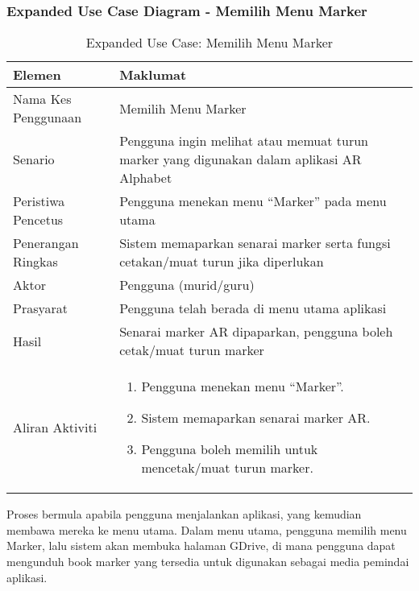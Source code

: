 \begin{itemize}
\begin{itemize}
\begin{itemize}
\begin{itemize}
\begin{itemize}
\begin{itemize}
\begin{itemize}
\begin{itemize}
\subsubsection{Expanded Use Case Diagram - Memilih Menu Marker}
\begin{table}[htbp]
\centering
\caption{Expanded Use Case: Memilih Menu Marker}
\begin{tabular}{lp{10cm}}
\toprule
\textbf{Elemen} & \textbf{Maklumat} \\
\midrule
Nama Kes Penggunaan & Memilih Menu Marker \\
Senario & Pengguna ingin melihat atau memuat turun marker yang digunakan dalam aplikasi AR Alphabet \\
Peristiwa Pencetus & Pengguna menekan menu “Marker” pada menu utama \\
Penerangan Ringkas & Sistem memaparkan senarai marker serta fungsi cetakan/muat turun jika diperlukan \\
Aktor & Pengguna (murid/guru) \\
Prasyarat & Pengguna telah berada di menu utama aplikasi \\
Hasil & Senarai marker AR dipaparkan, pengguna boleh cetak/muat turun marker \\
Aliran Aktiviti & 
\begin{enumerate}
    \item Pengguna menekan menu “Marker”.
    \item Sistem memaparkan senarai marker AR.
    \item Pengguna boleh memilih untuk mencetak/muat turun marker.
\end{enumerate} \\
\bottomrule
\end{tabular}
\label{jadual:expanded_menu_marker}
\end{table}


\flushleft Proses  bermula  apabila  pengguna menjalankan aplikasi, yang kemudian membawa mereka ke menu utama. Dalam menu utama, pengguna memilih menu Marker, lalu sistem akan membuka halaman GDrive, di mana pengguna  dapat mengunduh book marker yang tersedia untuk  digunakan sebagai media pemindai aplikasi.






\end{itemize}
\end{itemize}
\end{itemize}
\end{itemize}
\end{itemize}
\end{itemize}
\end{itemize}
\end{itemize}
